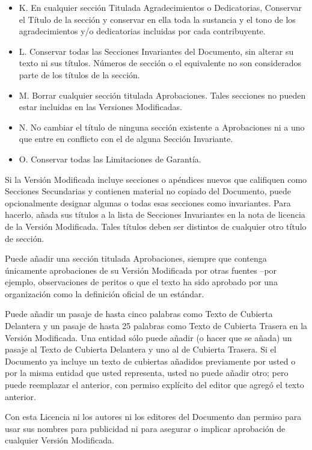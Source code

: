 \documentclass[letterpaper,12pt,titlepage]{article}
\begin{document}
\begin{itemize}
	\item K. En cualquier sección Titulada Agradecimientos o Dedicatorias, Conservar el Título de la sección y conservar en ella toda la sustancia y el tono de los agradecimientos y/o dedicatorias incluidas por cada contribuyente.
	\item L. Conservar todas las Secciones Invariantes del Documento, sin alterar su texto ni sus títulos. Números de sección o el equivalente no son considerados parte de los títulos de la sección.
	\item M. Borrar cualquier sección titulada Aprobaciones. Tales secciones no pueden estar incluidas en las Versiones Modificadas.
	\item N. No cambiar el título de ninguna sección existente a Aprobaciones ni a uno que entre en conflicto con el de alguna Sección Invariante.
	\item O. Conservar todas las Limitaciones de Garantía.
\end{itemize}

Si la Versión Modificada incluye secciones o apéndices nuevos que califiquen como Secciones Secundarias y contienen material no copiado del Documento, puede opcionalmente designar algunas o todas esas secciones como invariantes. Para hacerlo, añada sus títulos a la lista de Secciones Invariantes en la nota de licencia de la Versión Modificada. Tales títulos deben ser distintos de cualquier otro título de sección.\par

Puede añadir una sección titulada Aprobaciones, siempre que contenga únicamente aprobaciones de su Versión Modificada por otras fuentes –por ejemplo, observaciones de peritos o que el texto ha sido aprobado por una organización como la definición oficial de un estándar.\par

Puede añadir un pasaje de hasta cinco palabras como Texto de Cubierta Delantera y un pasaje de hasta 25 palabras como Texto de Cubierta Trasera en la Versión Modificada. Una entidad sólo puede añadir (o hacer que se añada) un pasaje al Texto de Cubierta Delantera y uno al de Cubierta Trasera. Si el Documento ya incluye un texto de cubiertas añadidos previamente por usted o por la misma entidad que usted representa, usted no puede añadir otro; pero puede reemplazar el anterior, con permiso explícito del editor que agregó el texto anterior.\par

Con esta Licencia ni los autores ni los editores del Documento dan permiso para usar sus nombres para publicidad ni para asegurar o implicar aprobación de cualquier Versión Modificada.\par
\end{document}
